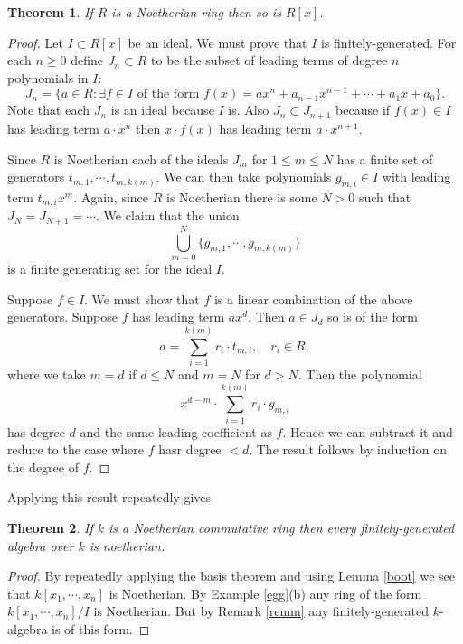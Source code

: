\documentclass [12pt,oneside,a4paper,mathscr]{amsart}
\newtheorem{thm}{Theorem}[section]
\theoremstyle{definition}
\renewcommand{\leq}{\leqslant}
\renewcommand{\geq}{\geqslant}
\newcommand{\lc}{\operatorname{lead}}
\begin{document}
\begin{thm}
If $R$ is a Noetherian ring then so is $R[x]$.
\end{thm}


\begin{proof}

Let $I\subset R[x]$ be an ideal. We must prove that $I$ is finitely-generated. For each $n\geq 0$ define $J_n \subset R$ to be the subset of leading terms of degree $n$ polynomials in $I$:
\[J_n=\big\{a\in R: \exists f\in I\text{ of the form }f(x)= ax^n + a_{n-1} x^{n-1}+ \cdots + a_1x + a_0\big\}.\]
Note that each $J_n$ is an ideal because $I$ is. Also $J_n \subset J_{n+1}$ because if $f(x)\in I$ has leading term $a\cdot x^n$ then $x\cdot f(x)$ has leading term $a\cdot x^{n+1}$. 

 Since $R$ is Noetherian each of the ideals $J_m$ for $1\leq m\leq N$ has a finite set of generators $t_{m,1}, \cdots ,t_{m,k(m)}$. We can then take polynomials $g_{m,i}\in I$ with leading term $t_{m,i} x^m$. Again, since $R$ is Noetherian there is some $N>0$ such that $J_N=J_{N+1}=\cdots$. We claim that the union
\[\bigcup_{m=0}^N \{g_{m,1}, \cdots ,g_{m,k(m)}\}\]
is a finite generating set for the ideal $I$.

Suppose $f\in I$. We must show that $f$ is a linear combination of the above generators.  Suppose $f$ has leading term  $ax^d$. Then  $a\in J_d$ so is of the form
\[a=\sum_{i=1}^{k(m)} r_i \cdot t_{m,i}, \quad r_i\in R,\]
where we take $m=d$ if $d\leq N$ and $m=N$ for $d>N$. Then the polynomial
\[x^{d-m} \cdot \sum_{i=1}^{k(m)} r_i\cdot g_{m,i}\]
has degree $d$ and the same  leading coefficient as $f$. Hence we can subtract it and reduce to the case where $f$ hasr degree $<d$. The result follows by induction on the degree of $f$.
\end{proof}

Applying this result repeatedly gives

\begin{thm}
If $k$ is a Noetherian commutative ring then every finitely-generated algebra over $k$ is noetherian.
\end{thm}

\begin{proof}
By repeatedly applying the basis theorem and using Lemma \ref{boot} we see that $k[x_1,\cdots, x_n]$ is Noetherian. By Example \ref{egg}(b) any ring of the form $k[x_1,\cdots, x_n]/I$ is Noetherian. But by Remark \ref{remm} any finitely-generated $k$-algebra is of this form.
\end{proof}
\end{document}
